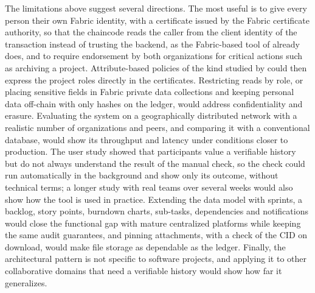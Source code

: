 The limitations above suggest several directions. The most useful is to give every person their own Fabric identity, with a certificate issued by the Fabric certificate authority, so that the chaincode reads the caller from the client identity of the transaction instead of trusting the backend, as the Fabric-based tool of \textcite{batista2021} already does, and to require endorsement by both organizations for critical actions such as archiving a project. Attribute-based policies of the kind studied by \textcite{gordijn2022combining} could then express the project roles directly in the certificates. Restricting reads by role, or placing sensitive fields in Fabric private data collections and keeping personal data off-chain with only hashes on the ledger, would address confidentiality and erasure. Evaluating the system on a geographically distributed network with a realistic number of organizations and peers, and comparing it with a conventional database, would show its throughput and latency under conditions closer to production. The user study showed that participants value a verifiable history but do not always understand the result of the manual check, so the check could run automatically in the background and show only its outcome, without technical terms; a longer study with real teams over several weeks would also show how the tool is used in practice. Extending the data model with sprints, a backlog, story points, burndown charts, sub-tasks, dependencies and notifications would close the functional gap with mature centralized platforms while keeping the same audit guarantees, and pinning attachments, with a check of the CID on download, would make file storage as dependable as the ledger. Finally, the architectural pattern is not specific to software projects, and applying it to other collaborative domains that need a verifiable history would show how far it generalizes.
